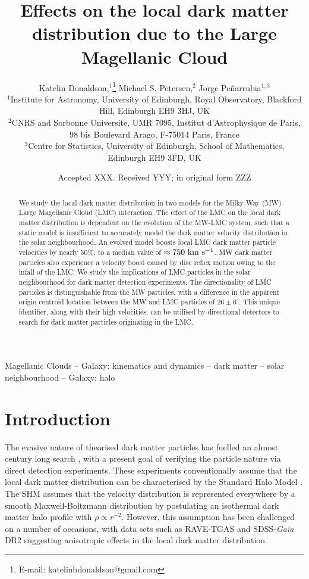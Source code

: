 \documentclass[fleqn,usenatbib]{mnras}
\title[Local LMC dark matter]{Effects on the local dark matter distribution due to the Large Magellanic Cloud}
\author[Donaldson et al.]{
Katelin Donaldson,$^{1}$\thanks{E-mail: katelinbdonaldson@gmail.com}
Michael S. Petersen,$^{2}$
Jorge Pe{\~n}arrubia$^{1,3}$
\\
$^1$Institute for Astronomy, University of Edinburgh, Royal Observatory, Blackford Hill, Edinburgh EH9 3HJ, UK\\ 
$^2$CNRS and Sorbonne Universite, UMR 7095, Institut d'Astrophysique de Paris, 98 bis Boulevard Arago, F-75014 Paris, France\\
$^3$Centre for Statistics, University of Edinburgh, School of Mathematics, Edinburgh EH9 3FD, UK
}
\date{Accepted XXX. Received YYY; in original form ZZZ}
\newcommand{\kms}{{\rm ~km~s^{-1}}}	%
\begin{document}
\label{firstpage}
\pagerange{\pageref{firstpage}--\pageref{lastpage}}
\maketitle

\begin{abstract}
We study the local dark matter distribution in two models for the Milky Way (MW)-Large Magellanic Cloud (LMC) interaction. The effect of the LMC on the local dark matter distribution is dependent on the evolution of the MW-LMC system, such that a static model is insufficient to accurately model the dark matter velocity distribution in the solar neighbourhood. An evolved model boosts local LMC dark matter particle velocities by nearly 50\%, to a median value of $\approx750\kms$. MW dark matter particles also experience a velocity boost caused by disc reflex motion owing to the infall of the LMC. We study the implications of LMC particles in the solar neighbourhood for dark matter detection experiments. The directionality of LMC particles is distinguishable from the MW particles, with a difference in the apparent origin centroid location between the MW and LMC particles of $26\pm6 ^\circ$. This unique identifier, along with their high velocities, can be utilised by directional detectors to search for dark matter particles originating in the LMC.
\end{abstract}

\begin{keywords}
Magellanic Clouds -- Galaxy: kinematics and dynamics -- dark matter -- solar neighbourhood -- Galaxy: halo
\end{keywords}



\section{Introduction}

The evasive nature of theorised dark matter particles has fuelled an almost century long search \citep{Zwicky_1937}, with a present goal of verifying the particle nature via direct detection experiments. These experiments conventionally assume that the local dark matter distribution can be characterised by the Standard Halo Model \citep[SHM;][]{Drukier_1986}. The SHM assumes that the velocity distribution is represented everywhere by a smooth Maxwell-Boltzmann distribution by postulating an isothermal dark matter halo profile with $\rho \propto r^{-2}$. However, this assumption has been challenged on a number of occasions, with data sets such as RAVE-TGAS \citep{Herzog_Arbeitman_2018} and SDSS-\emph{Gaia} DR2 \citep{Necib_2019} suggesting anisotropic effects in the local dark matter distribution.
\end{document}
